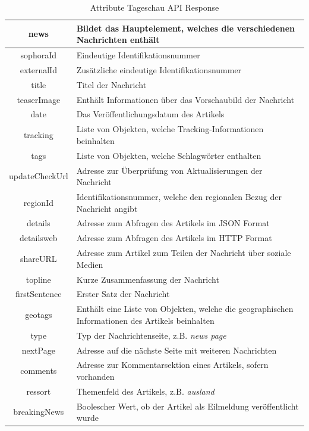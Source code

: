 \begin{table}   
    \centering
    \caption{Attribute Tageschau API Response}
    \label{tab:Attribute Tageschau API Response}
    \begin{tabular}{|c|p{11cm}|} \hline 
        news & Bildet das Hauptelement, welches die verschiedenen Nachrichten enthält \\ \hline 
        sophoraId & Eindeutige Identifikationsnummer \\ \hline 
        externalId & Zusätzliche eindeutige Identifikationsnummer \\ \hline 
        title & Titel der Nachricht \\ \hline 
        teaserImage & Enthält Informationen über das Vorschaubild der Nachricht \\ \hline 
        date & Das Veröffentlichungsdatum des Artikels \\ \hline 
        tracking & Liste von Objekten, welche Tracking-Informationen beinhalten\\ \hline 
        tags & Liste von Objekten, welche Schlagwörter enthalten \\ \hline 
        updateCheckUrl & Adresse zur Überprüfung von Aktualisierungen der Nachricht \\ \hline 
        regionId & Identifikationsnummer, welche den regionalen Bezug der Nachricht angibt \\ \hline 
        details & Adresse zum Abfragen des Artikels im JSON Format \\ \hline 
        detailsweb & Adresse zum Abfragen des Artikels im HTTP Format \\ \hline 
        shareURL & Adresse zum Artikel zum Teilen der Nachricht über soziale Medien \\ \hline 
        topline & Kurze Zusammenfassung der Nachricht \\ \hline 
        firstSentence & Erster Satz der Nachricht \\ \hline 
        geotags & Enthält eine Liste von Objekten, welche die geographischen Informationen des Artikels beinhalten \\ \hline 
        type & Typ der Nachrichtenseite, z.B. \textit{news page} \\ \hline 
        nextPage & Adresse auf die nächste Seite mit weiteren Nachrichten \\ \hline 
        comments & Adresse zur Kommentarsektion eines Artikels, sofern vorhanden \\ \hline 
        ressort & Themenfeld des Artikels, z.B. \textit{ausland} \\ \hline 
        breakingNews & Boolescher Wert, ob der Artikel als Eilmeldung veröffentlicht wurde \\ \hline
    \end{tabular}
\end{table}

